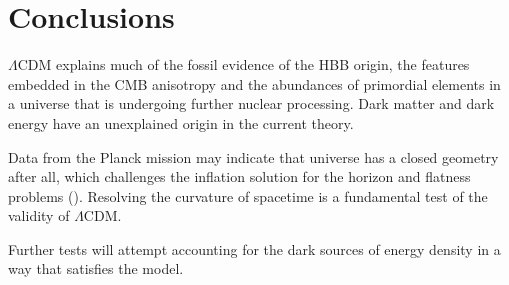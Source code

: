 \documentclass{paper}
\begin{document}
\section*{Conclusions}
  $\Lambda$CDM explains much of the fossil evidence
  of the HBB origin, the features embedded in the CMB anisotropy 
  and the abundances of primordial elements in a universe that is 
  undergoing further nuclear processing. Dark matter and dark energy have an 
  unexplained origin in the current theory.

  Data from the Planck mission may indicate that universe has a closed 
  geometry after all, which challenges the inflation solution for the horizon
  and flatness problems (\cite{2020NatAs...4..196D}). Resolving the 
  curvature of spacetime is a fundamental test of the validity of 
  $\Lambda$CDM. 

  Further tests will attempt accounting for the dark sources of
  energy density in a way that satisfies the model. 






\pagebreak
\begin{singlespace}
\printbibliography
\end{singlespace}

\end{document}
